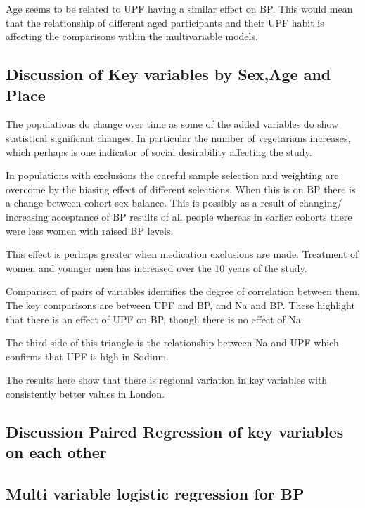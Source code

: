 \documentclass[
]{article}
\begin{document}
Age seems to be related to UPF having a similar effect on BP. This would
mean that the relationship of different aged participants and their UPF
habit is affecting the comparisons within the multivariable models.

\hypertarget{discussion-of-key-variables-by-sexage-and-place}{%
\subsection{Discussion of Key variables by Sex,Age and
Place}\label{discussion-of-key-variables-by-sexage-and-place}}

The populations do change over time as some of the added variables do
show statistical significant changes. In particular the number of
vegetarians increases, which perhaps is one indicator of social
desirability affecting the study.

In populations with exclusions the careful sample selection and
weighting are overcome by the biasing effect of different selections.
When this is on BP there is a change between cohort sex balance. This is
possibly as a result of changing/ increasing acceptance of BP results of
all people whereas in earlier cohorts there were less women with raised
BP levels.

This effect is perhaps greater when medication exclusions are made.
Treatment of women and younger men has increased over the 10 years of
the study.

Comparison of pairs of variables identifies the degree of correlation
between them. The key comparisons are between UPF and BP, and Na and BP.
These highlight that there is an effect of UPF on BP, though there is no
effect of Na.

The third side of this triangle is the relationship between Na and UPF
which confirms that UPF is high in Sodium.

The results here show that there is regional variation in key variables
with consistently better values in London.

\hypertarget{discussion-paired-regression-of-key-variables-on-each-other}{%
\subsection{Discussion Paired Regression of key variables on each
other}\label{discussion-paired-regression-of-key-variables-on-each-other}}

\hypertarget{multi-variable-logistic-regression-for-bp}{%
\subsection{Multi variable logistic regression for
BP}\label{multi-variable-logistic-regression-for-bp}}
\end{document}

